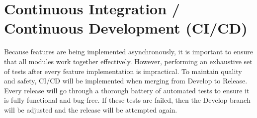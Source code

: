 \section{Continuous Integration / Continuous Development (CI/CD)} \label{section: CI-CD}

Because features are being implemented asynchronously, it is important to ensure that all modules work together effectively. However, performing an exhaustive set of tests after every feature implementation is impractical. To maintain quality and safety, CI/CD will be implemented when merging from Develop to Release. Every release will go through a thorough battery of automated tests to ensure it is fully functional and bug-free. If these tests are failed, then the Develop branch will be adjusted and the release will be attempted again.
